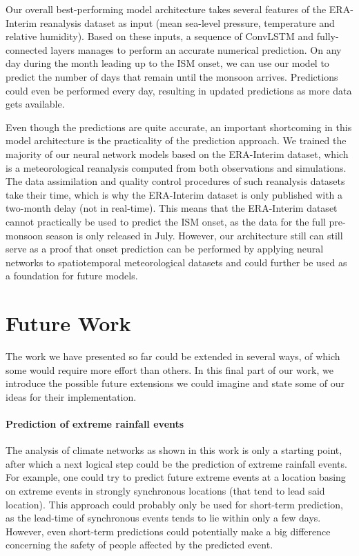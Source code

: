 Our overall best-performing model architecture takes several features of the ERA-Interim reanalysis dataset as input (mean sea-level pressure, temperature and relative humidity). Based on these inputs, a sequence of ConvLSTM and fully-connected layers manages to perform an accurate numerical prediction. On any day during the month leading up to the ISM onset, we can use our model to predict the number of days that remain until the monsoon arrives. Predictions could even be performed every day, resulting in updated predictions as more data gets available.

Even though the predictions are quite accurate, an important shortcoming in this model architecture is the practicality of the prediction approach. We trained the majority of our neural network models based on the ERA-Interim dataset, which is a meteorological reanalysis computed from both observations and simulations. The data assimilation and quality control procedures of such reanalysis datasets take their time, which is why the ERA-Interim dataset is only published with a two-month delay (not in real-time). This means that the ERA-Interim dataset cannot practically be used to predict the ISM onset, as the data for the full pre-monsoon season is only released in July. However, our architecture still can still serve as a proof that onset prediction can be performed by applying neural networks to spatiotemporal meteorological datasets and could further be used as a foundation for future models.

\newpage
\section{Future Work}
\label{st:conclusion_outlook}
The work we have presented so far could be extended in several ways, of which some would require more effort than others. In this final part of our work, we introduce the possible future extensions we could imagine and state some of our ideas for their implementation.

\paragraph{Prediction of extreme rainfall events}
The analysis of climate networks as shown in this work is only a starting point, after which a next logical step could be the prediction of extreme rainfall events. For example, one could try to predict future extreme events at a location basing on extreme events in strongly synchronous locations (that tend to lead said location).  This approach could probably only be used for short-term prediction, as the lead-time of synchronous events tends to lie within only a few days. However, even short-term predictions could potentially make a big difference concerning the safety of people affected by the predicted event.

